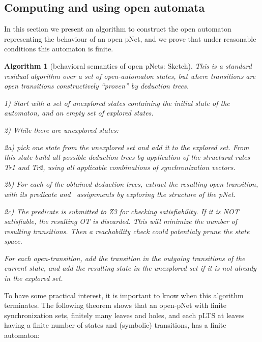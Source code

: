 \documentclass{lncs/llncs}
\newcommand{\TODO}[1]{\textcolor{red}{\textbf{[TODO:#1]}}}
\newcommand{\Post}{\symb{Post}}
\newtheorem{alg}[theorem]{Algorithm}
\begin{document}

\subsection{Computing and using open automata}
In this section we present an algorithm to construct the open
automaton representing the behaviour of an open pNet, and we prove that
under reasonable conditions this automaton is finite.

\begin{alg}[behavioral semantics of open pNets: Sketch]
This is a standard residual algorithm over a set of open-automaton
states, but where transitions are open transitions
constructively ``proven'' by deduction trees.

1) Start with a set of unexplored states containing the initial state
of the automaton, and an empty set of explored states.

2) While there are unexplored states:

2a) pick one state from the unexplored set and add it to the explored
set. From this state
build all possible deduction trees by application of the structural
rules Tr1 and Tr2, using all applicable combinations
of synchronization vectors.

2b) For each of the obtained deduction trees, extract the resulting
open-transition, with its predicate and \Post\ assignments by exploring the structure of 
the pNet.

2c)
The predicate is submitted to Z3 for checking satisfiability. If it is
NOT satisfiable, the resulting OT is discarded. This will minimize the
number of 
resulting transitions. Then a reachability check could potentialy
prune the state space.

For each open-transition,  add the transition in the outgoing transitions of
the current state, and add the
resulting state in the unexplored set if it is not already in the
explored set.

\end{alg}



To have some practical interest, it is important to know when this
algorithm terminates. The following theorem shows that an open-pNet
with finite synchronization sets, finitely many leaves and
holes, and each pLTS at leaves having a finite number of states and
(symbolic) transitions, has a finite automaton:
\end{document}
